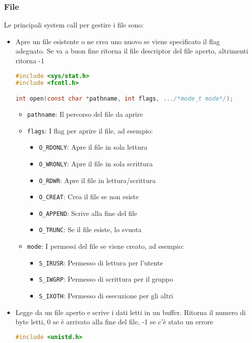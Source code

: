 \documentclass[a4paper]{article}
\begin{document}
\subsubsection{File}
Le principali system call per gestire i file sono:
\begin{itemize}
\item Apre un file esistente o ne crea uno nuovo se viene specificato il flag adeguato.
  Se va a buon fine ritorna il file descriptor del file aperto, altrimenti ritorna -1
  \begin{lstlisting}[language=C]
#include <sys/stat.h>
#include <fcntl.h>

int open(const char *pathname, int flags, .../*mode_t mode*/);
  \end{lstlisting}
  \begin{itemize}
    \item \texttt{pathname}: Il percorso del file da aprire
    \item \texttt{flags}: I flag per aprire il file, ad esempio:
      \begin{itemize}
        \item \texttt{O\_RDONLY}: Apre il file in sola lettura
        \item \texttt{O\_WRONLY}: Apre il file in sola scrittura
        \item \texttt{O\_RDWR}: Apre il file in lettura/scrittura
        \item \texttt{O\_CREAT}: Crea il file se non esiste
        \item \texttt{O\_APPEND}: Scrive alla fine del file
        \item \texttt{O\_TRUNC}: Se il file esiste, lo svuota
      \end{itemize}
    \item \texttt{mode}: I permessi del file se viene creato, ad esempio:
      \begin{itemize}
        \item \texttt{S\_IRUSR}: Permesso di lettura per l'utente
        \item \texttt{S\_IWGRP}: Permesso di scrittura per il gruppo
        \item \texttt{S\_IXOTH}: Permesso di esecuzione per gli altri
      \end{itemize}
  \end{itemize}

\item Legge da un file aperto e scrive i dati letti in un buffer. Ritorna il numero
  di byte letti, 0 se è arrivato alla fine del file, -1 se c'è stato un errore
  \begin{lstlisting}[language=C]
#include <unistd.h>


\end{lstlisting}
\end{itemize}
\end{document}
